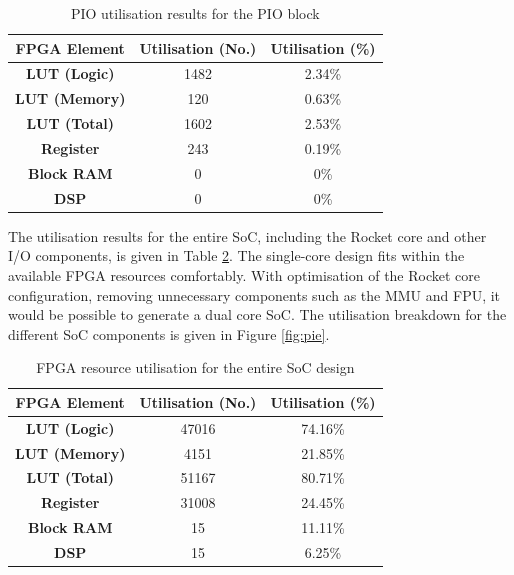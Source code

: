 \begin{table}[h!]
    \centering
    \begin{tabular}{|c|c|c|}
        \hline
        \textbf{FPGA Element} & \textbf{Utilisation (No.)} & \textbf{Utilisation  (\%)} \\
        \hline
        \textbf{LUT (Logic)}  & 1482                       & 2.34\%                     \\
        \hline
        \textbf{LUT (Memory)} & 120                        & 0.63\%                     \\
        \hline
        \textbf{LUT (Total)}  & 1602                       & 2.53\%                     \\
        \hline
        \textbf{Register}     & 243                        & 0.19\%                     \\
        \hline
        \textbf{Block RAM}    & 0                          & 0\%                        \\
        \hline
        \textbf{DSP}          & 0                          & 0\%                        \\
        \hline
    \end{tabular}
    \caption{PIO utilisation results for the PIO block}
    \label{tab:pio-util}
\end{table}

The utilisation results for the entire SoC, including the Rocket core and other I/O components, is given in Table \ref{tab:soc-util}. The single-core design fits within the available FPGA resources comfortably. With optimisation of the Rocket core configuration, removing unnecessary components such as the MMU and FPU, it would be possible to generate a dual core SoC. The utilisation breakdown for the different SoC components is given in Figure \ref{fig:pie}.

\begin{table}[H]
    \centering
    \begin{tabular}{|c|c|c|}
        \hline
        \textbf{FPGA Element} & \textbf{Utilisation (No.)} & \textbf{Utilisation  (\%)} \\
        \hline
        \textbf{LUT (Logic)}  & 47016                      & 74.16\%                    \\
        \hline
        \textbf{LUT (Memory)} & 4151                       & 21.85\%                    \\
        \hline
        \textbf{LUT (Total)}  & 51167                      & 80.71\%                    \\
        \hline
        \textbf{Register}     & 31008                      & 24.45\%                    \\
        \hline
        \textbf{Block RAM}    & 15                         & 11.11\%                    \\
        \hline
        \textbf{DSP}          & 15                         & 6.25\%                     \\
        \hline
    \end{tabular}
    \caption{FPGA resource utilisation for the entire SoC design}
    \label{tab:soc-util}
\end{table}

